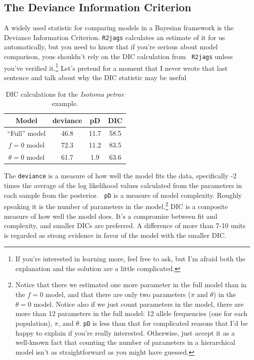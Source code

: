 \subsection*{The Deviance Information Criterion}

A widely used statistic for comparing models in a Bayesian framework
is the Deviance Information Criterion. {\tt R2jags} calculates an estimate of it for us
automatically, but you need to know that if you're serious about model
comparison, yous shouldn't rely on the DIC calculation from {\tt
  R2jags} unless you've verified it.\footnote{If you're interested in
  learning more, feel free to ask, but I'm afraid both the explanation
  and the solution are a little complicated.} Let's pretend for a
moment that I never wrote that last sentence and talk about why the
DIC statistic may be useful

\begin{table}
\begin{center}
\begin{tabular}{c|ccc}
\hline\hline
Model   & deviance & pD    & DIC \\
\hline
``Full'' model & 46.8 & 11.7 & 58.5 \\
$f = 0$ model & 72.3 & 11.2 & 83.5 \\
$\theta = 0$ model & 61.7 & 1.9 & 63.6 \\
\hline
\end{tabular}
\end{center}
\caption{DIC calculations for the {\it Isotoma petrae\/} example.}\label{table:isotoma-petraea-dic}
\end{table}

The {\tt deviance} is a measure of how well the model fits the data,
specifically -2 times the average of the log likelihood values
calculated from the parameters in each sample from the posterior. {\tt
  pD} is a measure of model complexity. Roughly speaking it is the
number of parameters in the model.\footnote{Notice that there we
  estimated one more parameter in the full model than in the $f=0$
  model, and that there are only two parameters ($\pi$ and $\theta$)
  in the $\theta=0$ model. Notice also if we just count parameters in
  the model, there are more than 12 parameters in the full model: 12
  allele frequencies (one for each population), $\pi$, and
  $\theta$. {\tt pD} is less than that for complicated reasons that
  I'd be happy to explain if you're really interested. Otherwise, just
  accept it as a well-known fact that counting the number of
  parameters in a hierarchical model isn't as straightforward as you
  might have guessed.} DIC is a composite measure of how well the
model does. It's a compromise between fit and complexity, and smaller
DICs are preferred. A difference of more than 7-10 units is regarded
as strong evidence in favor of the model with the smaller DIC.

